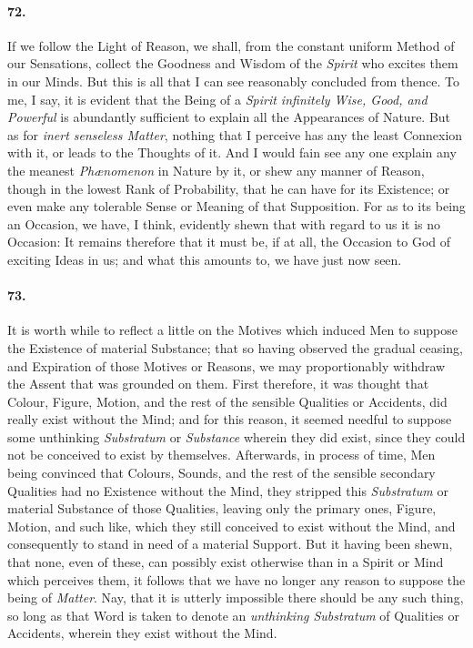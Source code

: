 \documentclass[]{article}
\newenvironment{sectionbody}{\begin{multicols}{2}}{\end{multicols}}
\begin{document}
\begin{sectionbody}
\paragraph{72.} If we follow the Light of Reason, we shall, from the constant
uniform Method of our Sensations, collect the Goodness and Wisdom
of the \emph{Spirit} who excites them in our Minds.  But this
is all that I can see reasonably concluded from thence.  To me, I
say, it is evident that the Being of a \emph{Spirit infinitely
Wise, Good, and Powerful} is abundantly sufficient to explain
all the Appearances of Nature.  But as for \emph{inert senseless
Matter}, nothing that I perceive has any the least Connexion
with it, or leads to the Thoughts of it.  And I would fain see
any one explain any the meanest \emph{Ph{\ae}nomenon} in
Nature by it, or shew any manner of Reason, though in the lowest
Rank of Probability, that he can have for its Existence; or even
make any tolerable Sense or Meaning of that Supposition.  For as
to its being an Occasion, we have, I think, evidently shewn that
with regard to us it is no Occasion: It remains therefore that it
must be, if at all, the Occasion to {\sc God} of exciting Ideas in us;
and what this amounts to, we have just now seen.



\paragraph{73.} It is worth while to reflect a little on the Motives which
induced Men to suppose the Existence of material Substance; that
so having observed the gradual ceasing, and Expiration of those
Motives or Reasons, we may proportionably withdraw the Assent
that was grounded on them.  First therefore, it was thought that
Colour, Figure, Motion, and the rest of the sensible Qualities or
Accidents, did really exist without the Mind; and for this
reason, it seemed needful to suppose some unthinking
\emph{Substratum} or \emph{Substance} wherein they did exist,
since they could not be conceived to exist by themselves.
Afterwards, in process of time, Men being convinced that Colours,
Sounds, and the rest of the sensible secondary Qualities had no
Existence without the Mind, they stripped this
\emph{Substratum} or material Substance of those Qualities,
leaving only the primary ones, Figure, Motion, and such like,
which they still conceived to exist without the Mind, and
consequently to stand in need of a material Support.  But it
having been shewn, that none, even of these, can possibly exist
otherwise than in a Spirit or Mind which perceives them, it
follows that we have no longer any reason to suppose the being of
\emph{Matter}.  Nay, that it is utterly impossible there should
be any such thing, so long as that Word is taken to denote an
\emph{unthinking Substratum} of Qualities or Accidents, wherein
they exist without the Mind.




\end{sectionbody}
\end{document}
